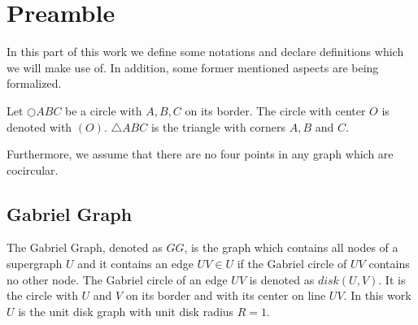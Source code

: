 \section{Preamble}
In this part of this work we define some notations and declare definitions which we will make use of.
In addition, some former mentioned aspects are being formalized.
 
Let $\bigcirc{ABC} $ be a circle with $A, B, C $ on its border.
The circle with center $O $ is denoted with $(O) $.
$\triangle{ABC} $ is the triangle with corners $A,B $ and $C $.

Furthermore, we assume that there are no four points in any graph which are cocircular.

\subsection{Gabriel Graph}
The Gabriel Graph, denoted as $GG $, is the graph which contains all nodes of a supergraph $U $ and it contains an edge $UV \in U $ if the Gabriel circle of $UV $ contains no other node.
The Gabriel circle of an edge $UV $ is denoted as $disk(U, V) $.
It is the circle with $U $ and $V $ on its border and with its center on line $UV $. 
In this work $U $ is the unit disk graph with unit disk radius $R = 1 $.


